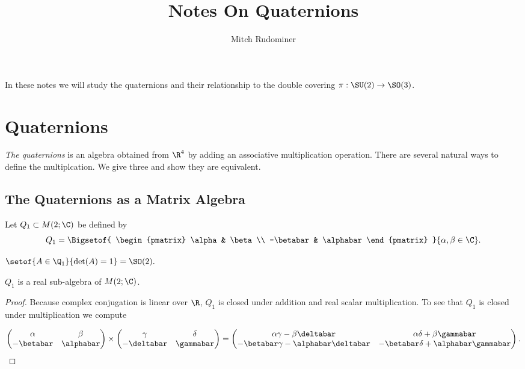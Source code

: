 \documentclass[oneside,12pt]{amsart}
\begin{document}
\title{Notes On Quaternions}
\author{Mitch Rudominer}

\maketitle

\tableofcontents

In these notes we will study the quaternions and their relationship to the double covering $\pi:\SU(2)\to \SO(3)$.

\section{Quaternions}
\emph{The quaternions} is an algebra obtained from $\R^4$ by adding an associative multiplication operation. There are several natural ways to define the multiplcation. We give three and show they are equivalent.

\subsection{The Quaternions as a Matrix Algebra}

Let $Q_1 \subset M(2; \C)$ be defined by 
$$
Q_1 = \Bigsetof{ \begin{pmatrix}
\alpha & \beta \\
-\betabar & \alphabar
\end{pmatrix} 
}{\alpha,\beta \in \C}.
$$

\begin{note}
$\setof{A\in\Q_1}{\det(A) = 1} = \SO(2).$
\end{note}


\begin{lemma} $Q_1$  is a real sub-algebra of $M(2; \C)$.
\end{lemma}
\begin{proof}
Because complex conjugation is linear over $\R$, $Q_1$ is closed under addition and real scalar multiplication.
To see that $Q_1$ is closed under multiplication we compute 

\begin{equation}
\label{eq:matrixmult}
\begin{pmatrix}
\alpha & \beta \\
-\betabar & \alphabar
\end{pmatrix}
\times
\begin{pmatrix}
\gamma & \delta \\
-\deltabar & \gammabar
\end{pmatrix} 
= 
\begin{pmatrix}
\alpha\gamma - \beta\deltabar & \alpha\delta + \beta\gammabar \\
-\betabar\gamma -\alphabar\deltabar & -\betabar\delta + \alphabar\gammabar
\end{pmatrix} .
\end{equation}
\end{proof}
\end{document}
